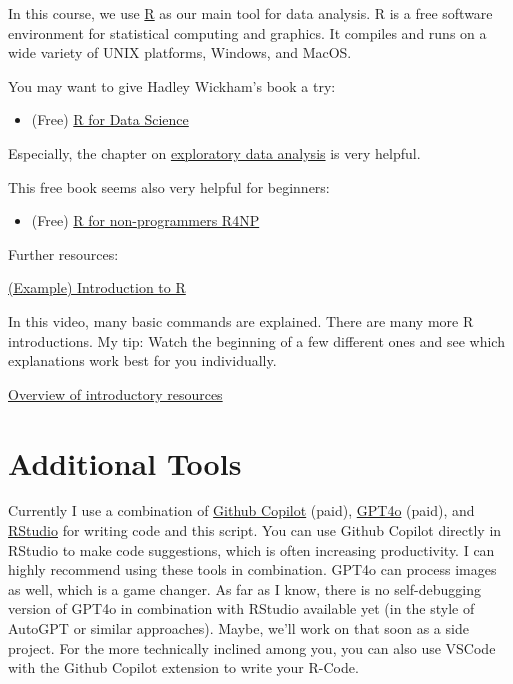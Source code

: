 \documentclass[
]{book}
\providecommand{\tightlist}{%
  \setlength{\itemsep}{0pt}\setlength{\parskip}{0pt}}
\begin{document}
In this course, we use \href{https://www.r-project.org/}{R} as our main tool for data analysis. R is a free software environment for statistical computing and graphics.
It compiles and runs on a wide variety of UNIX platforms, Windows, and MacOS.

You may want to give Hadley Wickham's book a try:

\begin{itemize}
\tightlist
\item
  (Free) \href{https://r4ds.had.co.nz/}{R for Data Science}
\end{itemize}

Especially, the chapter on \href{https://r4ds.hadley.nz/eda\#introduction}{exploratory data analysis} is very helpful.

This free book seems also very helpful for beginners:

\begin{itemize}
\tightlist
\item
  (Free) \href{https://bookdown.org/daniel_dauber_io/r4np_book/}{R for non-programmers R4NP}
\end{itemize}

Further resources:

\href{https://www.youtube.com/watch?v=V8eKsto3Ug&t=140s}{(Example) Introduction to R}

In this video, many basic commands are explained. There are many more R introductions.
My tip: Watch the beginning of a few different ones and see which explanations work best for you individually.

\href{https://cran.r-project.org/other-docs.html}{Overview of introductory resources}

\section{Additional Tools}\label{additional-tools}

Currently I use a combination of \href{https://github.com/features/copilot}{Github Copilot} (paid), \href{https://chatgpt.com/}{GPT4o} (paid), and \href{https://posit.co/download/rstudio-desktop/}{RStudio} for writing code and this script. You can use Github Copilot directly in RStudio to make code suggestions, which is often increasing productivity. I can highly recommend using these tools in combination. GPT4o can process images as well, which is a game changer.
As far as I know, there is no self-debugging version of GPT4o in combination with RStudio available yet (in the style of AutoGPT or similar approaches). Maybe, we'll work on that soon as a side project. For the more technically inclined among you,
you can also use VSCode with the Github Copilot extension to write your R-Code.
\end{document}
